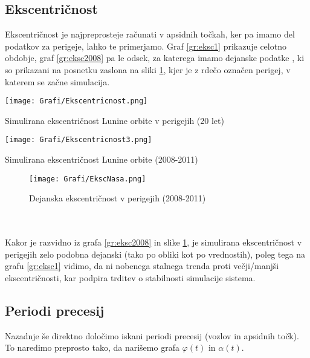 \documentclass{article}
\begin{document}
\subsection{Ekscentričnost}
\label{sec:eksc}
Ekscentričnost je najpreprosteje računati v apsidnih točkah, ker pa imamo del podatkov za perigeje, lahko te primerjamo. Graf \ref{gr:eksc1} prikazuje celotno obdobje, graf \ref{gr:eksc2008} pa le odsek, za katerega imamo dejanske podatke \cite{NASA:Lunar_orbit}, ki so prikazani na posnetku zaslona na sliki \ref{fig:eksc}, kjer je z rdečo označen perigej, v katerem se začne simulacija.
\begin{graph}
    \centering
    \texttt{[image: Grafi/Ekscentricnost.png]}
    \caption{Simulirana ekscentričnost Lunine orbite v perigejih (20 let)}
    \label{gr:eksc1}
\end{graph}

\begin{minipage}[t]{0.45\textwidth}
    \begin{graph}
        \centering
        \texttt{[image: Grafi/Ekscentricnost3.png]}
        \captionsetup{width=.8\linewidth}
        \caption{Simulirana ekscentričnost Lunine orbite (2008-2011)}
        \label{gr:eksc2008}
    \end{graph}
\end{minipage}\begin{minipage}[t]{0.45\textwidth}
    \begin{figure}[H]
        \centering
        \texttt{[image: Grafi/EkscNasa.png]}
        \captionsetup{width=0.8\linewidth}
        \caption{Dejanska ekscentričnost v perigejih (2008-2011)}
        \label{fig:eksc}
    \end{figure}
\end{minipage}\\\\

Kakor je razvidno iz grafa \ref{gr:eksc2008} in slike \ref{fig:eksc}, je simulirana ekscentričnost v perigejih zelo podobna dejanski (tako po obliki kot po vrednostih), poleg tega na grafu \ref{gr:eksc1} vidimo, da ni nobenega stalnega trenda proti večji/manjši ekscentričnosti, kar podpira trditev o stabilnosti simulacije sistema.

\subsection{Periodi precesij}
\label{sec:pp}
Nazadnje še direktno določimo iskani periodi precesij (vozlov in apsidnih točk). To naredimo preprosto tako, da narišemo grafa $\varphi(t)$ in $\alpha(t)$.
\end{document}
